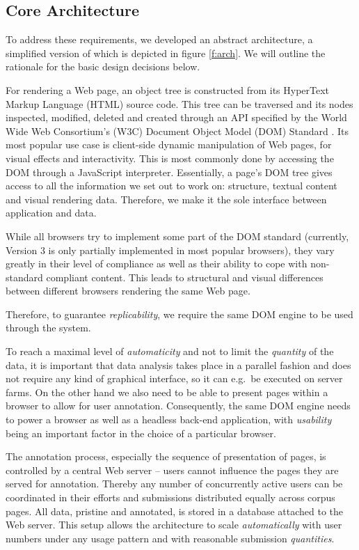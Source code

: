 \subsection{Core Architecture}

To address these requirements, we developed an abstract architecture, a simplified version of which is depicted in figure \ref{f:arch}.
We will outline the rationale for the basic design decisions below.


For rendering a Web page, an object tree is constructed from its HyperText Markup Language (HTML) source code.
This tree can be traversed and its nodes inspected, modified, deleted and created through an API specified by the World Wide Web Consortium's (W3C) Document Object Model (DOM) Standard \cite{dom}.
Its most popular use case is client-side dynamic manipulation of Web pages, for visual effects and interactivity.
This is most commonly done by accessing the DOM through a JavaScript interpreter.
Essentially, a page's DOM tree gives access to all the information we set out to work on: structure, textual content and visual rendering data.
Therefore, we make it the sole interface between application and data.

While all browsers try to implement some part of the DOM standard (currently, Version 3 is only partially implemented in most popular browsers), they vary greatly in their level of compliance as well as their ability to cope with non-standard compliant content.
This leads to structural and visual differences between different browsers rendering the same Web page.

Therefore, to guarantee \textit{replicability}, we require the same DOM engine to be used through the system.


To reach a maximal level of \textit{automaticity} and not to limit the \textit{quantity} of the data, it is important that data analysis takes place in a parallel fashion and does not require any kind of graphical interface, so it can e.g.~be executed on server farms.
On the other hand we also need to be able to present pages within a browser to allow for user annotation.
Consequently, the same DOM engine needs to power a browser as well as a headless back-end application, with \textit{usability} being an important factor in the choice of a particular browser.


The annotation process, especially the sequence of presentation of pages, is controlled by a central Web server -- users cannot influence the pages they are served for annotation.
Thereby any number of concurrently active users can be coordinated in their efforts and submissions distributed equally across corpus pages.
All data, pristine and annotated, is stored in a database attached to the Web server.
This setup allows the architecture to scale \textit{automatically} with user numbers under any usage pattern and with reasonable submission \textit{quantities}.


